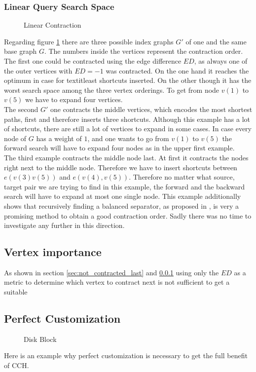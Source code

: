 \subsubsection{Linear Query Search Space}\label{sec:linear_query}

\begin{figure}
\centering

\caption{Linear Contraction}
\label{fig:linear_contraction}
\end{figure}

Regarding figure \ref{fig:linear_contraction} there are three possible index graphs $G'$ of one and the same base graph $G$. The numbers inside the vertices represent the contraction order.
\\
The first one could be contracted using the edge difference $ED$, as always one of the outer vertices with $ED=-1$ was contracted. On the one hand it reaches the optimum in case for textit{least shortcuts inserted}. On the other though it has the worst search space among the three vertex orderings. 
To get from node $v(1)$ to $v(5)$ we have to expand four vertices. 
\\
The second $G'$ one contracts the middle vertices, which encodes the most shortest paths, first and therefore inserts three shortcuts. Although this example has a lot of shortcuts, there are still a lot of vertices to expand in some cases. In case every node of $G$ has a weight of $1$, and one wants to go from $v(1)$ to $v(5)$ the forward search will have to expand four nodes as in the upper first example.
\\
The third example contracts the middle node last. At first it contracts the nodes right next to the middle node. Therefore we have to insert shortcuts between $e(v(3)v(5))$ and $e(v(4), v(5))$.
Therefore no matter what source, target pair we are trying to find in this example, the forward and the backward search will have to expand at most one single node. This example additionally shows that
recursively finding a balanced separator, as proposed in \cite[Customization Contraction Hierarchies]{CCH}, is very a promising method to obtain a good contraction order. Sadly there was no time to 
investigate any further in this direction.  

\subsection{Vertex importance}\label{sec:vertex_importance}

As shown in section \ref{sec:not_contracted_last} and \ref{sec:linear_query} using only the $ED$ as a metric to determine which vertex to contract next is not sufficient to get a suitable

\subsection{Perfect Customization}

\begin{figure}
    \centering
    
    \caption{Disk Block}
    \label{fig:perfectCustomization}
\end{figure}

Here is an example why perfect customization is necessary to get the full
benefit of CCH.


